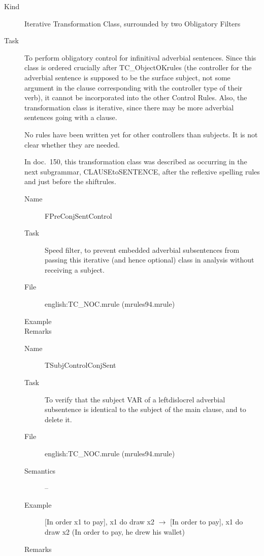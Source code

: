\begin{description}
\item[Kind] Iterative Transformation Class, surrounded by two Obligatory 
Filters
\item[Task] To perform obligatory control for infinitival adverbial sentences.
Since this class is ordered crucially after TC\_ObjectOKrules (the controller 
for the adverbial sentence is supposed to be the surface subject, not some
argument in the clause corresponding with the controller 
type of their verb),
it cannot be incorporated into the other Control Rules. Also, the 
transformation class is iterative, since there may be more adverbial sentences 
going with a clause.

No rules have been written yet for other controllers than subjects. It is not 
clear whether they are needed.

In doc.\ 150, this transformation class was described as occurring in the next 
subgrammar, CLAUSEtoSENTENCE, after the reflexive spelling rules and just 
before the shiftrules.

\vspace{1 cm}
\begin{description}
\item[Name] FPreConjSentControl
\item[Task] Speed filter, to prevent embedded adverbial subsentences from 
passing this iterative (and hence optional) class in analysis without receiving 
a subject.
\item[File] english:TC\_NOC.mrule (mrules94.mrule)
\item[Example] 
\item[Remarks] 
\end{description}

\vspace{1 cm}
\begin{description}
\item[Name] TSubjControlConjSent
\item[Task] To verify that the subject VAR 
of a leftdislocrel adverbial subsentence 
is identical to the subject of the main clause, and to delete it.
\item[File] english:TC\_NOC.mrule (mrules94.mrule)
\item[Semantics] --
\item[Example] [In order x1 to pay], x1 do draw x2 $\rightarrow$ 
[In order to pay], x1 do draw x2 (In order to pay, he drew his wallet)
\item[Remarks] 
\end{description}


\end{description}
